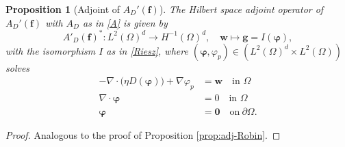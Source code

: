 \documentclass[final,leqno]{scrarticle}
\newtheorem{proposition}[theorem]{Proposition}
\newcommand{\lzo}{L^2(\Omega)}
\newcommand{\lzd}{{L^2(\Omega)^d}}
\begin{document}
\begin{proposition}[Adjoint of $A_D'(\mathbf{f})$]
    The Hilbert space adjoint operator of $A_D'(\mathbf{f})$ with $A_D$ as in \eqref{A} is given by    \begin{displaymath}
        A'_D(\mathbf{f})^*:\lzd \rightarrow H^{-1}(\Omega)^d, \quad \mathbf{w} \mapsto \mathbf{g} = I(\boldsymbol{\varphi}),
    \end{displaymath}
    with the isomorphism $I$ as in \eqref{Riesz},  where $(\boldsymbol{\varphi},\varphi_p) \in (\lzd\times\lzo)$ solves
          \begin{displaymath} 
 \begin{split}
  -\nabla \cdot \big( \eta D(\boldsymbol{\varphi}) \big) + \nabla \varphi_p &= \mathbf{w} \quad \text{in } \Omega\\
  \nabla \cdot \boldsymbol{\varphi} &= 0 \quad \text{in } \Omega\\
  \boldsymbol{\varphi} &= \mathbf{0} \quad \text{on} \ \partial \Omega .
 \end{split}
\end{displaymath}
\end{proposition}

\begin{proof}
Analogous to the proof of Proposition \ref{prop:adj-Robin}.
\end{proof}
\end{document}
